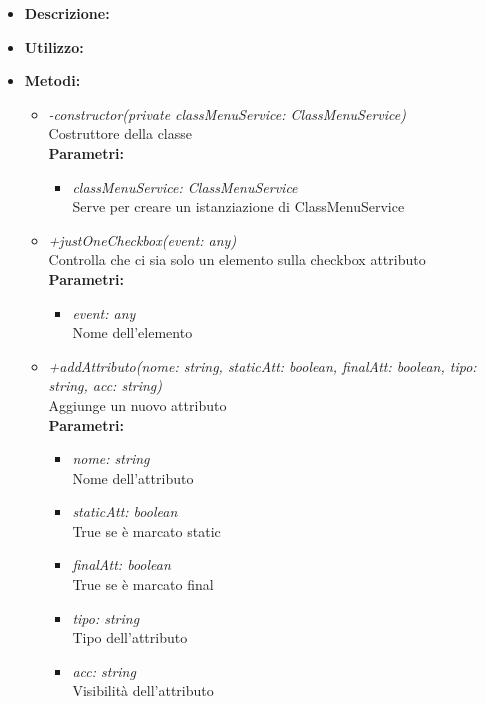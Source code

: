 \begin{itemize}
	\item \textbf{Descrizione:}\\
	
	\item \textbf{Utilizzo:}\\
	
	\item \textbf{Metodi:}
		\begin{itemize}
			\item \emph{-constructor(private classMenuService: ClassMenuService)}\\
    		Costruttore della classe\\
    		\textbf{Parametri:}
    		\begin{itemize}
    			\item \emph{classMenuService: ClassMenuService}\\
    			Serve per creare un istanziazione di ClassMenuService
    		\end{itemize}
    		\item \emph{+justOneCheckbox(event: any)}\\
    		Controlla che ci sia solo un elemento sulla checkbox attributo\\
    		\textbf{Parametri:}
    		\begin{itemize}
    			\item \emph{event: any}\\
    			Nome dell'elemento
    		\end{itemize}
    		\item \emph{+addAttributo(nome: string, staticAtt: boolean, finalAtt: boolean, tipo: string, acc: string) }\\
    		Aggiunge un nuovo attributo\\
    		\textbf{Parametri:}
    		\begin{itemize}
    			\item \emph{nome: string}\\
    			Nome dell'attributo
    			\item \emph{staticAtt: boolean}\\
    			True se è marcato static
    			\item \emph{finalAtt: boolean}\\
    			True se è marcato final
    			\item \emph{tipo: string}\\
    			Tipo dell'attributo
    			\item \emph{acc: string}\\
    			Visibilità dell'attributo
    		\end{itemize}
		\end{itemize}
\end{itemize}